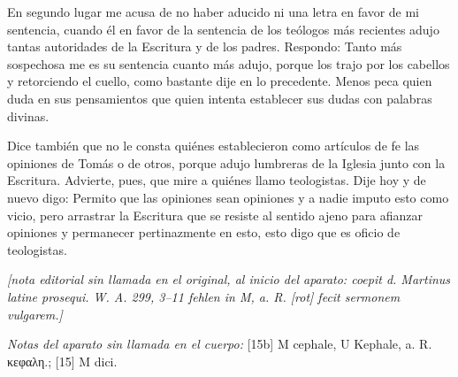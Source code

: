En segundo lugar me acusa de no haber aducido ni una letra en favor de mi sentencia, cuando él en favor de la sentencia de los teólogos más recientes adujo tantas autoridades de la Escritura y de los padres. Respondo: Tanto más sospechosa me es su sentencia cuanto más adujo, porque los trajo por los cabellos y retorciendo el cuello, como bastante dije en lo precedente. Menos peca quien duda en sus pensamientos que quien intenta establecer sus dudas con palabras divinas.

Dice también que no le consta quiénes establecieron como artículos de fe las opiniones de Tomás o de otros, porque adujo lumbreras de la Iglesia junto con la Escritura. Advierte, pues, que mire a quiénes llamo teologistas. Dije hoy y de nuevo digo: Permito que las opiniones sean opiniones y a nadie imputo esto como vicio, pero arrastrar la Escritura que se resiste al sentido ajeno para afianzar opiniones y permanecer pertinazmente en esto, esto digo que es oficio de teologistas.

\noindent\textit{[nota editorial sin llamada en el original, al inicio del aparato: coepit d. Martinus latine prosequi. W. A. 299, 3–11 fehlen in M, a. R. [rot] fecit sermonem vulgarem.]}

\noindent\textit{Notas del aparato sin llamada en el cuerpo:} [15b] M cephale, U Kephale, a. R. κεφαλη.; [15] M dici.

